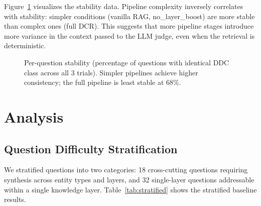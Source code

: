 \documentclass[11pt,a4paper]{article}
\begin{document}
Figure~\ref{fig:stability} visualizes the stability data. Pipeline complexity inversely correlates with stability: simpler conditions (vanilla RAG, no\_layer\_boost) are more stable than complex ones (full DCR). This suggests that more pipeline stages introduce more variance in the context passed to the LLM judge, even when the retrieval is deterministic.

\begin{figure}[t]
\centering
{}
\caption{Per-question stability (percentage of questions with identical DDC class across all 3 trials). Simpler pipelines achieve higher consistency; the full pipeline is least stable at 68\%.}
\label{fig:stability}
\end{figure}

\section{Analysis}
\label{sec:analysis}

\subsection{Question Difficulty Stratification}
\label{sec:stratification}

We stratified questions into two categories: 18 cross-cutting questions requiring synthesis across entity types and layers, and 32 single-layer questions addressable within a single knowledge layer. Table~\ref{tab:stratified} shows the stratified baseline results.
\end{document}
